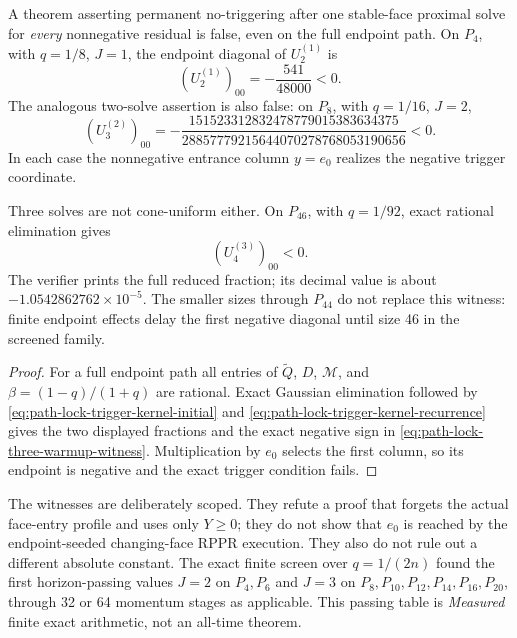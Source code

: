 \documentclass[11pt]{article}
\begin{document}
\begin{proposition}
\label{prop:path-lock-cone-witnesses}
A theorem asserting permanent no-triggering after one stable-face proximal
solve for \emph{every} nonnegative residual is false, even on the full
endpoint path.  On \(P_4\), with \(q=1/8\), \(J=1\), the endpoint diagonal
of \(U_2^{(1)}\) is
\begin{equation}
 (U_2^{(1)})_{00}=-\frac{541}{48000}<0.
 \label{eq:path-lock-one-warmup-witness}
\end{equation}
The analogous two-solve assertion is also false: on \(P_8\), with
\(q=1/16\), \(J=2\),
\begin{equation}
 (U_3^{(2)})_{00}
 =-\frac{151523312832478779015383634375}
 {28857779215644070278768053190656}<0.
 \label{eq:path-lock-two-warmup-witness}
\end{equation}
In each case the nonnegative entrance column \(y=e_0\) realizes the negative
trigger coordinate.

Three solves are not cone-uniform either.  On \(P_{46}\), with
\(q=1/92\), exact rational elimination gives
\begin{equation}
 (U_4^{(3)})_{00}<0.
 \label{eq:path-lock-three-warmup-witness}
\end{equation}
The verifier prints the full reduced fraction; its decimal value is about
\(-1.0542862762\times10^{-5}\).  The smaller sizes through \(P_{44}\) do not
replace this witness: finite endpoint effects delay the first negative
diagonal until size 46 in the screened family.
\end{proposition}

\begin{proof}
For a full endpoint path all entries of \(\widetilde Q\), \(D\),
\(\mathcal M\), and \(\beta=(1-q)/(1+q)\) are rational.  Exact Gaussian
elimination followed by
\eqref{eq:path-lock-trigger-kernel-initial} and
\eqref{eq:path-lock-trigger-kernel-recurrence}
gives the two displayed fractions and the exact negative sign in
\eqref{eq:path-lock-three-warmup-witness}.  Multiplication by \(e_0\)
selects the first column, so its endpoint is negative and the exact trigger
condition fails.
\end{proof}

The witnesses are deliberately scoped.  They refute a proof that forgets the
actual face-entry profile and uses only \(Y\geq0\); they do not show that
\(e_0\) is reached by the endpoint-seeded changing-face RPPR execution.  They
also do not rule out a different absolute constant.  The exact finite screen
over \(q=1/(2n)\) found the first horizon-passing values \(J=2\) on
\(P_4,P_6\) and \(J=3\) on \(P_8,P_{10},P_{12},P_{14},P_{16},P_{20}\),
through 32 or 64 momentum stages as applicable.  This passing table is
\emph{Measured} finite exact arithmetic, not an all-time theorem.
\end{document}
